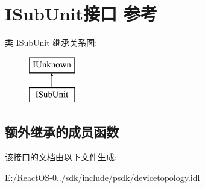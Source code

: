 \hypertarget{interface_i_sub_unit}{}\section{I\+Sub\+Unit接口 参考}
\label{interface_i_sub_unit}
类 I\+Sub\+Unit 继承关系图\+:\begin{figure}[H]
\begin{center}
\leavevmode
\includegraphics[height=2.000000cm]{interface_i_sub_unit}
\end{center}
\end{figure}
\subsection*{额外继承的成员函数}


该接口的文档由以下文件生成\+:\begin{DoxyCompactItemize}
\item 
E\+:/\+React\+O\+S-\/0../sdk/include/psdk/devicetopology.\+idl\end{DoxyCompactItemize}
